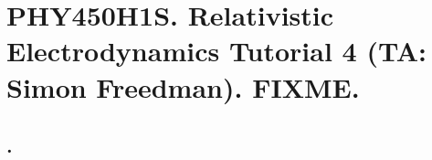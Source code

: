 
%

\chapter{PHY450H1S.  Relativistic Electrodynamics Tutorial 4 (TA: Simon Freedman).  FIXME.}
\label{chap:relativisticElectrodynamicsT4}
{}
\date{Mar 3, 2011}

\beginArtWithToc

\section{.}

\EndArticle
